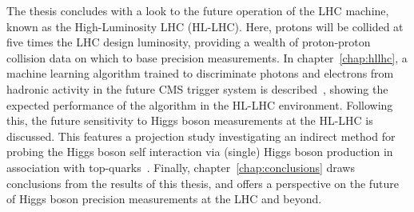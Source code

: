 The thesis concludes with a look to the future operation of the LHC machine, known as the High-Luminosity LHC (HL-LHC). Here, protons will be collided at five times the LHC design luminosity, providing a wealth of proton-proton collision data on which to base precision measurements. In chapter~\ref{chap:hllhc}, a machine learning algorithm trained to discriminate photons and electrons from hadronic activity in the future CMS trigger system is described~\cite{CERN-LHCC-2020-004}, showing the expected performance of the algorithm in the HL-LHC environment. Following this, the future sensitivity to Higgs boson measurements at the HL-LHC is discussed. This features a projection study investigating an indirect method for probing the Higgs boson self interaction via (single) Higgs boson production in association with top-quarks~\cite{CMS-PAS-FTR-18-020}. Finally, chapter~\ref{chap:conclusions} draws conclusions from the results of this thesis, and offers a perspective on the future of Higgs boson precision measurements at the LHC and beyond.